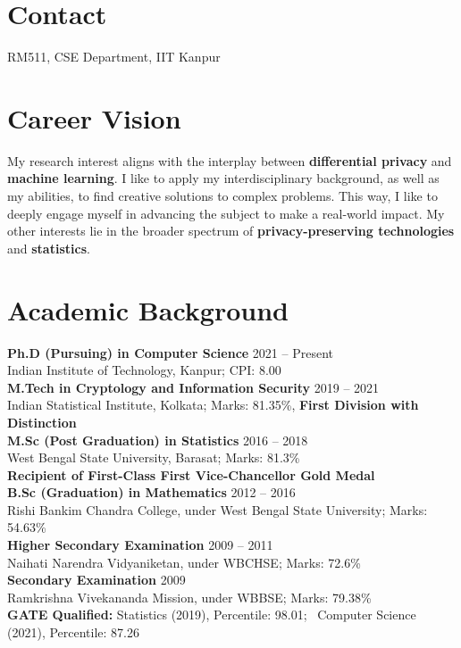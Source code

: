 \documentclass[margin,line]{res}
\newcommand{\cvlink}[2]{\hspace{0.3em}\href{#2}{#1}}
\newcommand{\edu}[4]{{\bf #1} \hfill{#2}\\ #3; #4\\[2pt]}
\begin{document}
\vspace*{-.15in}

\begin{resume}
\section{\sc Contact}
RM511, CSE Department, IIT Kanpur\hfill
{\large
\cvlink{\faEnvelope}{mailto:sarbajitg@cse.iitk.ac.in}
\cvlink{\faGlobe}{https://ghosh-sarbajit.github.io/}
\cvlink{}{https://scholar.google.com/citations?user=AVrr4S8AAAAJ}
\cvlink{}{https://www.semanticscholar.org/author/Sarbajit-Ghosh/152709675}
\cvlink{}{https://dblp.org/pid/350/8503.html}
\cvlink{}{https://www.scopus.com/authid/detail.uri?authorId=58102872800}
\cvlink{}{https://orcid.org/0009-0008-2477-586X}
\cvlink{\faGithub}{https://github.com/ghosh-sarbajit}
\cvlink{\faLinkedin}{https://www.linkedin.com/in/sarbajit-ghosh-a91b7a157/}}

\section{\sc Career Vision}
My research interest aligns with the interplay between \textbf{differential privacy} and \textbf{machine learning}. I like to apply my interdisciplinary background, as well as my abilities, to find creative solutions to complex problems. This way, I like to deeply engage myself in advancing the subject to make a real-world impact. My other interests lie in the broader spectrum of \textbf{privacy-preserving technologies} and \textbf{statistics}.

\section{\sc Academic Background}
\edu{Ph.D (Pursuing) in Computer Science}{2021 -- Present}
    {Indian Institute of Technology, Kanpur}{CPI: 8.00}
\edu{M.Tech in Cryptology and Information Security}{2019 -- 2021}
    {Indian Statistical Institute, Kolkata}{Marks: 81.35\%, \textbf{First Division with Distinction}}
\edu{M.Sc (Post Graduation) in Statistics}{2016 -- 2018}
    {West Bengal State University, Barasat}{Marks: 81.3\%\\ \textbf{Recipient of First-Class First Vice-Chancellor Gold Medal}}
\edu{B.Sc (Graduation) in Mathematics}{2012 -- 2016}
    {Rishi Bankim Chandra College, under West Bengal State University}{Marks: 54.63\%}
\edu{Higher Secondary Examination}{2009 -- 2011}
    {Naihati Narendra Vidyaniketan, under WBCHSE}{Marks: 72.6\%}
\edu{Secondary Examination}{2009}
    {Ramkrishna Vivekananda Mission, under WBBSE}{Marks: 79.38\%}
{\bf GATE Qualified:} Statistics (2019), Percentile: 98.01; \ Computer Science (2021), Percentile: 87.26


\end{resume}
\end{document}
